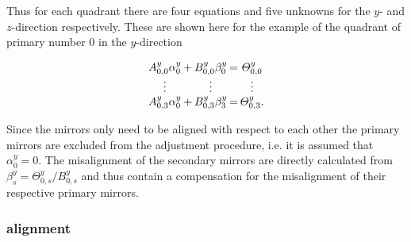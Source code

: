 Thus for each quadrant there are four equations and five unknowns for the $y$- and $z$-direction respectively. These are shown here for the example of the quadrant of primary number 0 in the $y$-direction

\begin{equation*}
  \label{eq:zeroQuadrantMirrorTilts}
  \arraycolsep=1pt
  \begin{array}{*{5}c}
    A^y_{0,0}\alpha^y_0 & + & B^y_{0,0}\beta^y_0 & = & \varTheta^y_{0,0} \\
    \vdots              &   & \vdots             &   & \vdots \\
    A^y_{0,3}\alpha^y_0 & + & B^y_{0,3}\beta^y_3 & = & \varTheta^y_{0,3}.
  \end{array}
\end{equation*}

Since the mirrors only need to be aligned with respect to each other the primary mirrors are excluded from the adjustment procedure, i.e. it is assumed that $\alpha^y_0=0$. The misalignment of the secondary mirrors are directly calculated from $\beta^y_s=\varTheta^y_{0,s}/B^y_{0,s}$ and thus contain a compensation for the misalignment of their respective primary mirrors.


\subsubsection{\richtwo alignment}

